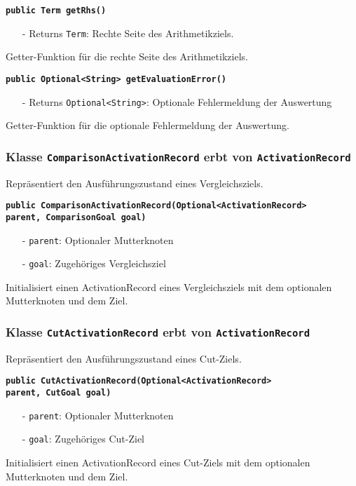 \documentclass[parskip=full,11pt,twoside]{scrartcl}
\begin{document}
\textbf{\texttt{public Term getRhs()}}
\begin{itemize}[noitemsep]
	\item[-] Returns \texttt{Term}: Rechte Seite des Arithmetikziels.
\end{itemize}
Getter-Funktion für die rechte Seite des Arithmetikziels.

\textbf{\texttt{public Optional<String> getEvaluationError()}}
\begin{itemize}[noitemsep]
	\item[-] Returns \texttt{Optional<String>}: Optionale Fehlermeldung der Auswertung
\end{itemize}
Getter-Funktion für die optionale Fehlermeldung der Auswertung.

\subsubsection{Klasse \texttt{ComparisonActivationRecord} erbt von \texttt{ActivationRecord}}
Repräsentiert den Ausführungszustand eines Vergleichsziels.

\textbf{\texttt{public ComparisonActivationRecord(Optional<ActivationRecord>\\ parent, ComparisonGoal goal)}}
\begin{itemize}[noitemsep]
	\item[-] \texttt{parent}: Optionaler Mutterknoten
	\item[-] \texttt{goal}: Zugehöriges Vergleichsziel
\end{itemize}
Initialisiert einen ActivationRecord eines Vergleichsziels mit dem optionalen Mutterknoten und dem Ziel.

\subsubsection{Klasse \texttt{CutActivationRecord} erbt von \texttt{ActivationRecord}}
Repräsentiert den Ausführungszustand eines Cut-Ziels.

\textbf{\texttt{public CutActivationRecord(Optional<ActivationRecord>\\ parent, CutGoal goal)}}
\begin{itemize}[noitemsep]
	\item[-] \texttt{parent}: Optionaler Mutterknoten
	\item[-] \texttt{goal}: Zugehöriges Cut-Ziel
\end{itemize}
Initialisiert einen ActivationRecord eines Cut-Ziels mit dem optionalen Mutterknoten und dem Ziel.
\end{document}
